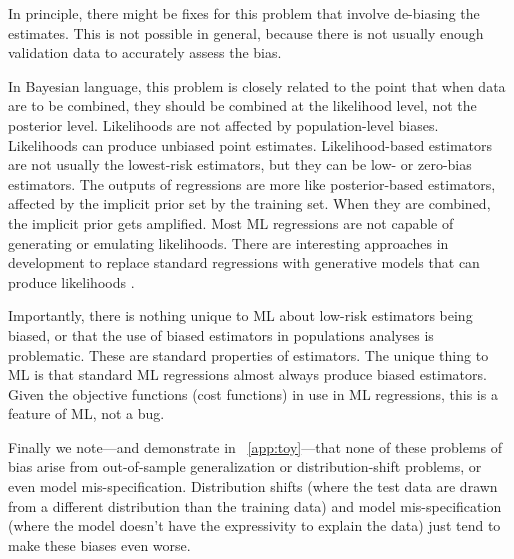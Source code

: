 \documentclass{article}
\begin{document}
In principle, there might be fixes for this problem that involve de-biasing the estimates.
This is not possible in general, because there is not usually enough validation data to accurately assess the bias.

In Bayesian language, this problem is closely related to the point that when data are to be combined, they should be combined at the likelihood level, not the posterior level.
Likelihoods are not affected by population-level biases.
Likelihoods can produce unbiased point estimates.
Likelihood-based estimators are not usually the lowest-risk estimators, but they can be low- or zero-bias estimators.
The outputs of regressions are more like posterior-based estimators, affected by the implicit prior set by the training set.
When they are combined, the implicit prior gets amplified.
Most ML regressions are not capable of generating or emulating likelihoods.
There are interesting approaches in development to replace standard regressions with generative models that can produce likelihoods \cite{cannon, biwei, likelihood_ratio}.

Importantly, there is nothing unique to ML about low-risk estimators being biased, or that the use of biased estimators in populations analyses is problematic.
These are standard properties of estimators.
The unique thing to ML is that standard ML regressions almost always produce biased estimators.
Given the objective functions (cost functions) in use in ML regressions, this is a feature of ML, not a bug.

Finally we note---and demonstrate in \appendixname~\ref{app:toy}---that none of these problems of bias arise from out-of-sample generalization or distribution-shift problems, or even model mis-specification.
Distribution shifts (where the test data are drawn from a different distribution than the training data) and model mis-specification (where the model doesn't have the expressivity to explain the data) just tend to make these biases even worse.
\end{document}
